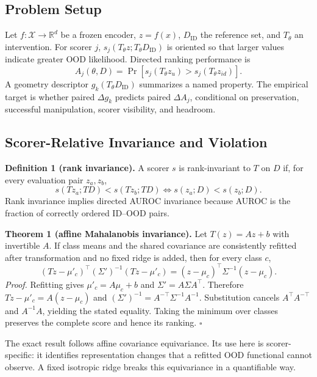 \documentclass[pdflatex,sn-basic]{sn-jnl}
\theoremstyle{plain}
\theoremstyle{definition}
\theoremstyle{remark}
\begin{document}
\subsection{Problem Setup}
Let $f:\mathcal{X}\rightarrow\mathbb{R}^{d}$ be a frozen encoder, $z=f(x)$, $D_{\mathrm{ID}}$ the reference set, and $T_\theta$ an intervention. For scorer $j$, $s_j(T_\theta z;T_\theta D_{\mathrm{ID}})$ is oriented so that larger values indicate greater OOD likelihood. Directed ranking performance is
\begin{equation}
A_j(\theta,D)=\Pr\!\left[s_j(T_\theta z_u)>s_j(T_\theta z_{id})\right].
\end{equation}
A geometry descriptor $g_k(T_\theta D_{\mathrm{ID}})$ summarizes a named property. The empirical target is whether paired $\Delta g_k$ predicts paired $\Delta A_j$, conditional on preservation, successful manipulation, scorer visibility, and headroom.

\subsection{Scorer-Relative Invariance and Violation}
\textbf{Definition 1 (rank invariance).} A scorer $s$ is rank-invariant to $T$ on $D$ if, for every evaluation pair $z_a,z_b$,
\begin{equation}
s(Tz_a;TD)<s(Tz_b;TD)\iff s(z_a;D)<s(z_b;D).
\end{equation}
Rank invariance implies directed AUROC invariance because AUROC is the fraction of correctly ordered ID--OOD pairs.

\textbf{Theorem 1 (affine Mahalanobis invariance).} Let $T(z)=Az+b$ with invertible $A$. If class means and the shared covariance are consistently refitted after transformation and no fixed ridge is added, then for every class $c$,
\begin{equation}
(Tz-\mu'_c)^\top(\Sigma')^{-1}(Tz-\mu'_c)
=(z-\mu_c)^\top\Sigma^{-1}(z-\mu_c).
\end{equation}
\emph{Proof.} Refitting gives $\mu'_c=A\mu_c+b$ and $\Sigma'=A\Sigma A^\top$. Therefore $Tz-\mu'_c=A(z-\mu_c)$ and $(\Sigma')^{-1}=A^{-\top}\Sigma^{-1}A^{-1}$. Substitution cancels $A^\top A^{-\top}$ and $A^{-1}A$, yielding the stated equality. Taking the minimum over classes preserves the complete score and hence its ranking. \hfill$\square$

The exact result follows affine covariance equivariance. Its use here is scorer-specific: it identifies representation changes that a refitted OOD functional cannot observe. A fixed isotropic ridge breaks this equivariance in a quantifiable way.
\end{document}
